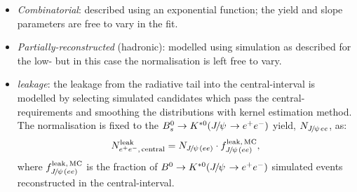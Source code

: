 \begin{itemize}

\item \textit{Combinatorial}: described using an exponential function;
the yield and slope parameters are free to vary in the fit.

\item \textit{Partially-reconstructed} (hadronic): modelled using simulation as described for the low-\qsq 
but in this case the normalisation is left free to vary.

%
%

\item \textit{\BdToKstJPs leakage}: the leakage from the \jpsi radiative tail into the central-\qsq interval is modelled by selecting 
simulated \BdToKstJPsee candidates which pass the central-\qsq requirements and smoothing the distributions
with kernel estimation method. The normalisation is fixed to the $\Bs\to\Kstarz(\jpsi\to\ee)$ yield, 
$N_{\jpsi ee}$, as:
%
$$N_{\ee, \, {\rm central}}^{\rm leak} = N_{\jpsi(ee)} \cdot f_{\jpsi(ee)}^{\rm leak, \,MC},$$
%
where $f_{\jpsi(ee)}^{\rm leak, \,MC}$ is the fraction of $\Bd\to\Kstarz(\jpsi\to\ee)$ simulated events reconstructed
in the central-\qsq interval.

\end{itemize}


